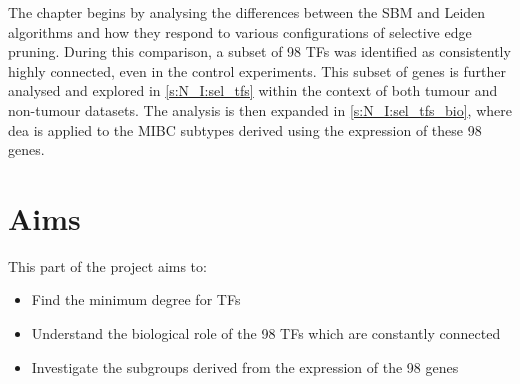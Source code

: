 The chapter begins by analysing the differences between the SBM and Leiden algorithms and how they respond to various configurations of selective edge pruning. During this comparison, a subset of 98 TFs was identified as consistently highly connected, even in the control experiments. This subset of genes is further analysed and explored in \cref{s:N_I:sel_tfs} within the context of both tumour and non-tumour datasets. The analysis is then expanded in \cref{s:N_I:sel_tfs_bio}, where \acrfull{dea} is applied to the MIBC subtypes derived using the expression of these 98 genes.





% 

\section{Aims}

This part of the project aims to:
\begin{itemize}
    \item Find the minimum degree for TFs
    \item Understand the biological role of the 98 TFs which are constantly connected
    \item Investigate the subgroups derived from the expression of the 98 genes
\end{itemize}


